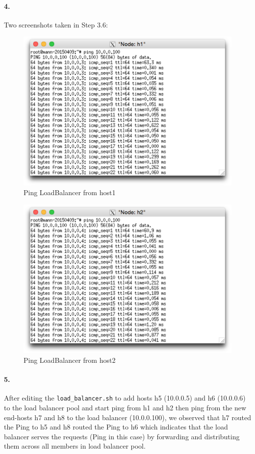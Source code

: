 \documentclass[a4paper]{article}
\begin{document}
\paragraph{4. } Two screenshots taken in Step 3.6:
\begin{figure}[H]
  \centering
    \includegraphics[scale=.34]{ping_lb_from_h1.png}
  \caption{Ping LoadBalancer from host1}
\end{figure}
\begin{figure}[H]
  \centering
    \includegraphics[scale=.34]{ping_lb_from_h2.png}
  \caption{Ping LoadBalancer from host2}
\end{figure}

\paragraph{5. } After editing the \texttt{load\_balancer.sh} to add hosts h5 (10.0.0.5) and h6 (10.0.0.6) to the load balancer pool and start ping from h1 and h2 then ping from the new end-hosts h7 and h8 to the load balancer (10.0.0.100), we observed that h7 routed the Ping to h5 and h8 routed the Ping to h6 which indicates that the load balancer serves the requests (Ping in this case) by forwarding and distributing them across all members in load balancer pool.
\end{document}
